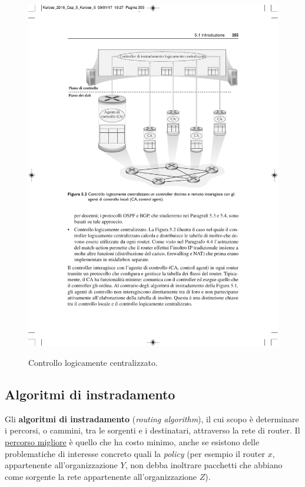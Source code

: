 \documentclass[a4paper]{article}
\begin{document}
	\begin{figure}[!htp]
		\centering
		\includegraphics[width=\textwidth]{img/controllo_logicamente_centralizzato.pdf}\label{controllo_logicamente_centralizzato}
		\caption{Controllo logicamente centralizzato.}
	\end{figure}\newpage
	
	\subsection{Algoritmi di instradamento}
	
	Gli \textcolor{Red3}{\textbf{algoritmi di instradamento}} (\emph{routing algorithm}), il cui scopo è determinare i percorsi, o cammini, tra le sorgenti e i destinatari, attraverso la rete di router. Il \underline{percorso migliore} è quello che ha costo minimo, anche se esistono delle problematiche di interesse concreto quali la \emph{policy} (per esempio il router $x$, appartenente all’organizzazione $Y$, non debba inoltrare pacchetti che abbiano come sorgente la rete appartenente all’organizzazione $Z$).\newline
	
\end{document}
